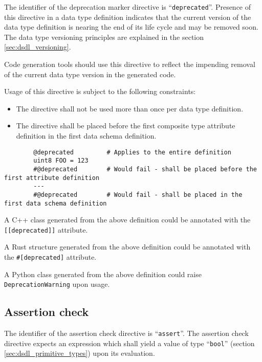 The identifier of the deprecation marker directive is ``\verb|deprecated|''.
Presence of this directive in a data type definition indicates that the current version of the data type definition
is nearing the end of its life cycle and may be removed soon.
The data type versioning principles are explained in the section \ref{sec:dsdl_versioning}.

Code generation tools should use this directive to reflect the impending removal of the current data type version
in the generated code.

Usage of this directive is subject to the following constraints:
\begin{itemize}
    \item The directive shall not be used more than once per data type definition.
    \item The directive shall be placed before the first composite type attribute definition in
    the first data schema definition.
\end{itemize}

\begin{remark}
    \begin{verbatim}
        @deprecated         # Applies to the entire definition
        uint8 FOO = 123
        #@deprecated        # Would fail - shall be placed before the first attribute definition
        ---
        #@deprecated        # Would fail - shall be placed in the first data schema definition
    \end{verbatim}

    A C++ class generated from the above definition could be annotated with the \verb|[[deprecated]]| attribute.

    A Rust structure generated from the above definition could be annotated with the \verb|#[deprecated]| attribute.

    A Python class generated from the above definition could raise \verb|DeprecationWarning| upon usage.
\end{remark}

\subsection{Assertion check}

The identifier of the assertion check directive is ``\verb|assert|''.
The assertion check directive expects an expression which shall yield a value of type
``\verb|bool|'' (section \ref{sec:dsdl_primitive_types}) upon its evaluation.


